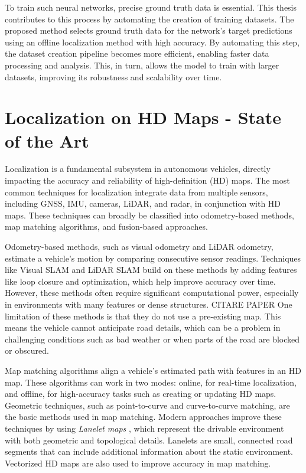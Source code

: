 To train such neural networks, precise ground truth data is essential. This thesis contributes to this process by automating the creation of training datasets. The proposed method selects ground truth data for the network's target predictions using an offline localization method with high accuracy. By automating this step, the dataset creation pipeline becomes more efficient, enabling faster data processing and analysis. This, in turn, allows the model to train with larger datasets, improving its robustness and scalability over time.

\section{Localization on HD Maps - State of the Art}

Localization is a fundamental subsystem in autonomous vehicles, directly impacting the accuracy and reliability of high-definition (HD) maps. The most common techniques for localization integrate data from multiple sensors, including GNSS, IMU, cameras, LiDAR, and radar, in conjunction with HD maps. These techniques can broadly be classified into odometry-based methods, map matching algorithms, and fusion-based approaches.

Odometry-based methods, such as visual odometry and LiDAR odometry, estimate a vehicle's motion by comparing consecutive sensor readings. Techniques like Visual SLAM and LiDAR SLAM build on these methods by adding features like loop closure and optimization, which help improve accuracy over time. However, these methods often require significant computational power, especially in environments with many features or dense structures. CITARE PAPER
One limitation of these methods is that they do not use a pre-existing map. This means the vehicle cannot anticipate road details, which can be a problem in challenging conditions such as bad weather or when parts of the road are blocked or obscured.

Map matching algorithms align a vehicle's estimated path with features in an HD map. These algorithms can work in two modes: online, for real-time localization, and offline, for high-accuracy tasks such as creating or updating HD maps. 
Geometric techniques, such as point-to-curve and curve-to-curve matching, are the basic methods used in map matching. Modern approaches improve these techniques by using \textit{Lanelet maps} \cite{6856487}, which represent the drivable environment with both geometric and topological details. Lanelets are small, connected road segments that can include additional information about the static environment. Vectorized HD maps are also used to improve accuracy in map matching.

